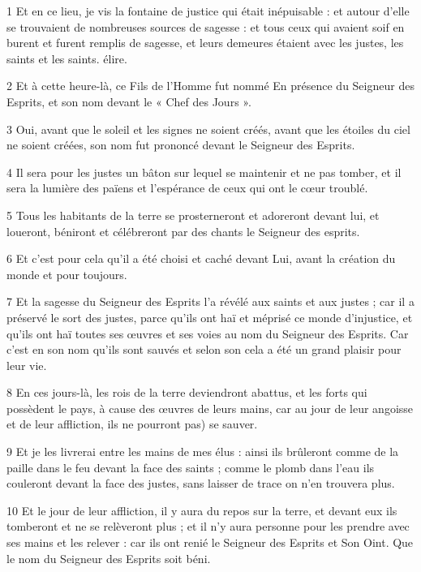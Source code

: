 \par 1 Et en ce lieu, je vis la fontaine de justice qui était inépuisable : et autour d'elle se trouvaient de nombreuses sources de sagesse : et tous ceux qui avaient soif en burent et furent remplis de sagesse, et leurs demeures étaient avec les justes, les saints et les saints. élire.
\par 2 Et à cette heure-là, ce Fils de l'Homme fut nommé En présence du Seigneur des Esprits, et son nom devant le « Chef des Jours ».
\par 3 Oui, avant que le soleil et les signes ne soient créés, avant que les étoiles du ciel ne soient créées, son nom fut prononcé devant le Seigneur des Esprits.
\par 4 Il sera pour les justes un bâton sur lequel se maintenir et ne pas tomber, et il sera la lumière des païens et l'espérance de ceux qui ont le cœur troublé.
\par 5 Tous les habitants de la terre se prosterneront et adoreront devant lui, et loueront, béniront et célébreront par des chants le Seigneur des esprits.
\par 6 Et c'est pour cela qu'il a été choisi et caché devant Lui, avant la création du monde et pour toujours.
\par 7 Et la sagesse du Seigneur des Esprits l'a révélé aux saints et aux justes ; car il a préservé le sort des justes, parce qu'ils ont haï et méprisé ce monde d'injustice, et qu'ils ont haï toutes ses œuvres et ses voies au nom du Seigneur des Esprits. Car c'est en son nom qu'ils sont sauvés et selon son cela a été un grand plaisir pour leur vie.
\par 8 En ces jours-là, les rois de la terre deviendront abattus, et les forts qui possèdent le pays, à cause des œuvres de leurs mains, car au jour de leur angoisse et de leur affliction, ils ne pourront pas) se sauver.
\par 9 Et je les livrerai entre les mains de mes élus : ainsi ils brûleront comme de la paille dans le feu devant la face des saints ; comme le plomb dans l'eau ils couleront devant la face des justes, sans laisser de trace on n’en trouvera plus.
\par 10 Et le jour de leur affliction, il y aura du repos sur la terre, et devant eux ils tomberont et ne se relèveront plus ; et il n'y aura personne pour les prendre avec ses mains et les relever : car ils ont renié le Seigneur des Esprits et Son Oint. Que le nom du Seigneur des Esprits soit béni.



